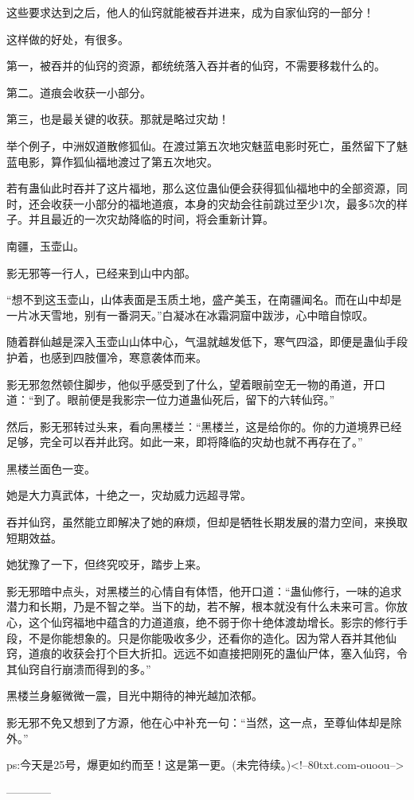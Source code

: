 \begin{this_body}
这些要求达到之后，他人的仙窍就能被吞并进来，成为自家仙窍的一部分！

这样做的好处，有很多。

第一，被吞并的仙窍的资源，都统统落入吞并者的仙窍，不需要移栽什么的。

第二。道痕会收获一小部分。

第三，也是最关键的收获。那就是略过灾劫！

举个例子，中洲奴道散修狐仙。在渡过第五次地灾魅蓝电影时死亡，虽然留下了魅蓝电影，算作狐仙福地渡过了第五次地灾。

若有蛊仙此时吞并了这片福地，那么这位蛊仙便会获得狐仙福地中的全部资源，同时，还会收获一小部分的福地道痕，本身的灾劫会往前跳过至少1次，最多5次的样子。并且最近的一次灾劫降临的时间，将会重新计算。

南疆，玉壶山。

影无邪等一行人，已经来到山中内部。

“想不到这玉壶山，山体表面是玉质土地，盛产美玉，在南疆闻名。而在山中却是一片冰天雪地，别有一番洞天。”白凝冰在冰霜洞窟中跋涉，心中暗自惊叹。

随着群仙越是深入玉壶山山体中心，气温就越发低下，寒气四溢，即便是蛊仙手段护着，也感到四肢僵冷，寒意袭体而来。

影无邪忽然顿住脚步，他似乎感受到了什么，望着眼前空无一物的甬道，开口道：“到了。眼前便是我影宗一位力道蛊仙死后，留下的六转仙窍。”

然后，影无邪转过头来，看向黑楼兰：“黑楼兰，这是给你的。你的力道境界已经足够，完全可以吞并此窍。如此一来，即将降临的灾劫也就不再存在了。”

黑楼兰面色一变。

她是大力真武体，十绝之一，灾劫威力远超寻常。

吞并仙窍，虽然能立即解决了她的麻烦，但却是牺牲长期发展的潜力空间，来换取短期效益。

她犹豫了一下，但终究咬牙，踏步上来。

影无邪暗中点头，对黑楼兰的心情自有体悟，他开口道：“蛊仙修行，一味的追求潜力和长期，乃是不智之举。当下的劫，若不解，根本就没有什么未来可言。你放心，这个仙窍福地中蕴含的力道道痕，绝不弱于你十绝体渡劫增长。影宗的修行手段，不是你能想象的。只是你能吸收多少，还看你的造化。因为常人吞并其他仙窍，道痕的收获会打个巨大折扣。远远不如直接把刚死的蛊仙尸体，塞入仙窍，令其仙窍自行崩溃而得到的多。”

黑楼兰身躯微微一震，目光中期待的神光越加浓郁。

影无邪不免又想到了方源，他在心中补充一句：“当然，这一点，至尊仙体却是除外。”

ps:今天是25号，爆更如约而至！这是第一更。(未完待续。)<!--80txt.com-ouoou-->

------------

\end{this_body}

